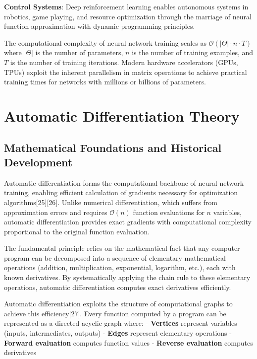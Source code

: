 \documentclass[11pt,a4paper]{report}
\begin{document}
\textbf{Control Systems}: Deep reinforcement learning enables autonomous systems in robotics, game playing, and resource optimization through the marriage of neural function approximation with dynamic programming principles.

The computational complexity of neural network training scales as $\mathcal{O}(|\Theta| \cdot n \cdot T)$ where $|\Theta|$ is the number of parameters, $n$ is the number of training examples, and $T$ is the number of training iterations. Modern hardware accelerators (GPUs, TPUs) exploit the inherent parallelism in matrix operations to achieve practical training times for networks with millions or billions of parameters.

\section{Automatic Differentiation Theory}

\subsection{Mathematical Foundations and Historical Development}

Automatic differentiation forms the computational backbone of neural network training, enabling efficient calculation of gradients necessary for optimization algorithms[25][26]. Unlike numerical differentiation, which suffers from approximation errors and requires $\mathcal{O}(n)$ function evaluations for $n$ variables, automatic differentiation provides exact gradients with computational complexity proportional to the original function evaluation.

The fundamental principle relies on the mathematical fact that any computer program can be decomposed into a sequence of elementary mathematical operations (addition, multiplication, exponential, logarithm, etc.), each with known derivatives. By systematically applying the chain rule to these elementary operations, automatic differentiation computes exact derivatives efficiently.

Automatic differentiation exploits the structure of computational graphs to achieve this efficiency[27]. Every function computed by a program can be represented as a directed acyclic graph where:
- \textbf{Vertices} represent variables (inputs, intermediates, outputs)  
- \textbf{Edges} represent elementary operations
- \textbf{Forward evaluation} computes function values
- \textbf{Reverse evaluation} computes derivatives
\end{document}
